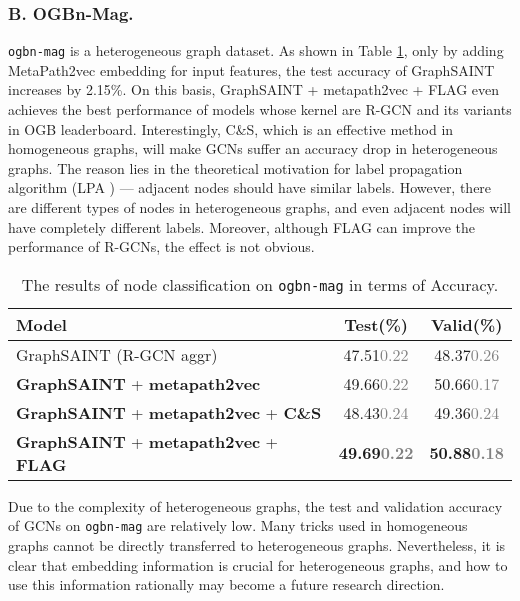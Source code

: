 \documentclass[runningheads]{llncs}
\newcommand{\std}[1]{\textcolor{gray}{\scriptsize{#1}}}
\begin{document}
\subsubsection{B. OGBn-Mag.}
\texttt{ogbn-mag} is a heterogeneous graph dataset. As shown
in Table \ref{table:ogbn-mag}, only by adding MetaPath2vec embedding for input features, the test accuracy of GraphSAINT increases 
by 2.15\%. On this basis, GraphSAINT + metapath2vec + FLAG even achieves the best performance of models whose kernel are R-GCN and its variants in OGB leaderboard. Interestingly, C\&S, which is an effective
method in homogeneous graphs, will make GCNs suffer an accuracy drop in heterogeneous graphs. The reason lies in the theoretical motivation for label propagation algorithm (LPA \cite{zhu2005semi})
--- adjacent nodes should have similar labels. However, there are
different types of nodes in heterogeneous graphs, and even
adjacent nodes will have completely different labels. Moreover, although FLAG can
improve the performance of R-GCNs, the effect is not obvious.

\begin{table}[htbp] 
\caption{The results of node classification on \texttt{ogbn-mag} in terms of Accuracy. }
\label{table:ogbn-mag}
\begin{center}
\renewcommand\tabcolsep{7.0pt}
\begin{tabular}{l|c|c}
\hline
\textbf{Model}  & \textbf{Test(\%)} & \textbf{Valid(\%)}  \\
\hline
\hline
GraphSAINT (R-GCN aggr) \cite{zeng2019graphsaint} & 47.51\std{0.22} & 48.37\std{0.26} \\
\hline
\hline
\textbf{GraphSAINT} + \textbf{metapath2vec} & 49.66\std{0.22} & 50.66\std{0.17} \\
\textbf{GraphSAINT} + \textbf{metapath2vec} + \textbf{C\&S} & 48.43\std{0.24} & 49.36\std{0.24} \\
\textbf{GraphSAINT} + \textbf{metapath2vec} + \textbf{FLAG} & \textbf{49.69\std{0.22}} &
\textbf{50.88\std{0.18}} \\
\hline
\end{tabular}
\end{center} 
\end{table}

Due to the complexity of heterogeneous graphs, the test and validation accuracy of GCNs on \texttt{ogbn-mag} are
relatively low. Many tricks used in homogeneous graphs cannot be
directly transferred to heterogeneous graphs. Nevertheless, it is clear that
embedding information is crucial for heterogeneous graphs, and how
to use this information rationally may become a future research direction.
\end{document}
